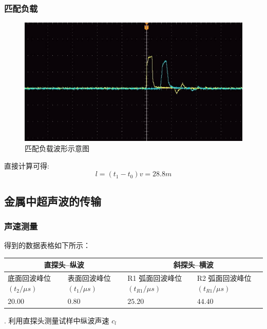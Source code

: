 \documentclass[UTF8]{ctexart}
\begin{document}
\subsubsection{匹配负载}
\begin{figure}[H]
  \centering
  \includegraphics[scale=0.26]{3.jpg}
  \caption{匹配负载波形示意图}
  \label{fig:my_label}
\end{figure}

直接计算可得:
$$
l=\left(t_{1}-t_{0}\right) v=28.8 m
$$



\subsection{金属中超声波的传输}

\subsubsection{声速测量}

\noindent 得到的数据表格如下所示：

\begin{center}
  
\begin{tabular}{|l|l|l|l|}
  \hline \multicolumn{2}{|c|}{ 直探头–纵波 } & \multicolumn{2}{|c|}{ 斜探头–横波 } \\
  \hline 底面回波峰位 $\left(t_{2} / \mu s\right)$ & 表面回波峰位 $\left(t_{1} / \mu s\right)$ & R1 弧面回波峰位 $\left(t_{R 1} / \mu s\right)$ & R2 弧面回波峰位 $\left(t_{R 1} / \mu s\right)$ \\
  \hline $20.00$ & $0.80$ & $25.20$ & $44.40$ \\
  \hline
\end{tabular}
\end{center}

. 利用直探头测量试样中纵波声速 $c_{l}$
\end{document}
